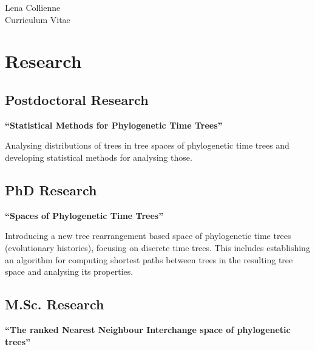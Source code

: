 \documentclass[10pt]{article} %
\begin{document}
\begin{paracol}{2} %


\parbox[top][0.12\textheight][c]{\linewidth}{ %
	\vspace{-0.04\textheight} %
	\centering %
	{\sffamily\Huge Lena Collienne}\\\medskip %
	{\Huge\color{headings}\cvtextfont Curriculum Vitae}
}


\section{Research}

\subsection*{Postdoctoral Research}
{\raggedright\textbf{``Statistical Methods for Phylogenetic Time Trees''}\\\medskip}

Analysing distributions of trees in tree spaces of phylogenetic time trees and developing statistical methods for analysing those.

\subsection*{PhD Research}
{\raggedright\textbf{``Spaces of Phylogenetic Time Trees''}\\\medskip}

Introducing a new tree rearrangement based space of phylogenetic time trees (evolutionary histories), focusing on discrete time trees.
This includes establishing an algorithm for computing shortest paths between trees in the resulting tree space and analysing its properties.


\subsection*{M.Sc. Research}
{\raggedright\textbf{``The ranked Nearest Neighbour Interchange space of phylogenetic trees''}\\\medskip}


\end{paracol}
\end{document}
